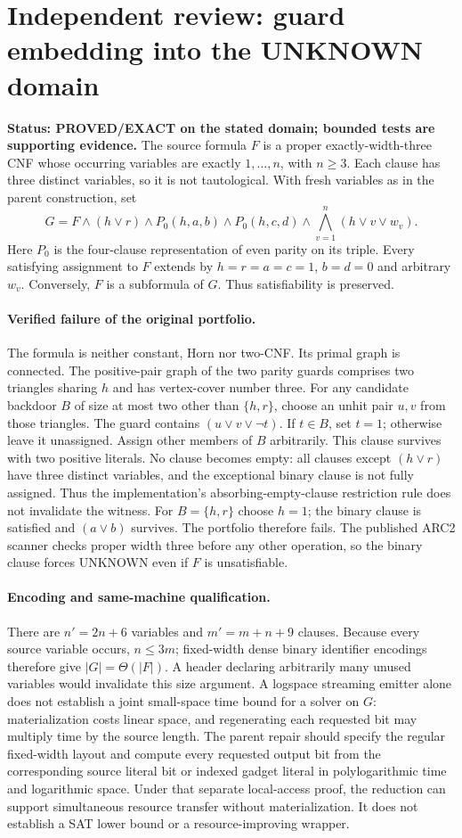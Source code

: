 \documentclass{article}
\begin{document}
\section*{Independent review: guard embedding into the UNKNOWN domain}
\textbf{Status: PROVED/EXACT on the stated domain; bounded tests are supporting evidence.}
The source formula $F$ is a proper exactly-width-three CNF whose occurring
variables are exactly $1,\ldots,n$, with $n\geq3$. Each clause has three distinct
variables, so it is not tautological. With fresh variables as in the parent
construction, set
\[
G=F\wedge(h\vee r)\wedge P_0(h,a,b)\wedge P_0(h,c,d)
\wedge\bigwedge_{v=1}^n(h\vee v\vee w_v).
\]
Here $P_0$ is the four-clause representation of even parity on its triple.
Every satisfying assignment to $F$ extends by $h=r=a=c=1$, $b=d=0$ and arbitrary
$w_v$. Conversely, $F$ is a subformula of $G$. Thus satisfiability is preserved.

\paragraph{Verified failure of the original portfolio.}
The formula is neither constant, Horn nor two-CNF. Its primal graph is connected.
The positive-pair graph of the two parity guards comprises two triangles sharing
$h$ and has vertex-cover number three. For any candidate backdoor $B$ of size
at most two other than $\{h,r\}$, choose an unhit pair $u,v$ from those triangles.
The guard contains $(u\vee v\vee\neg t)$. If $t\in B$, set $t=1$; otherwise
leave it unassigned. Assign other members of $B$ arbitrarily. This clause
survives with two positive literals. No clause becomes empty: all clauses except
$(h\vee r)$ have three distinct variables, and the exceptional binary clause is
not fully assigned. Thus the implementation's absorbing-empty-clause restriction
rule does not invalidate the witness. For $B=\{h,r\}$ choose $h=1$; the binary
clause is satisfied and $(a\vee b)$ survives. The portfolio therefore fails.
The published ARC2 scanner checks proper width three before any other operation,
so the binary clause forces UNKNOWN even if $F$ is unsatisfiable.

\paragraph{Encoding and same-machine qualification.}
There are $n'=2n+6$ variables and $m'=m+n+9$ clauses. Because every source variable
occurs, $n\leq3m$; fixed-width dense binary identifier encodings therefore give
$|G|=\Theta(|F|)$. A header declaring arbitrarily many unused variables would
invalidate this size argument. A logspace streaming emitter alone does not
establish a joint small-space time bound for a solver on $G$: materialization
costs linear space, and regenerating each requested bit may multiply time by
the source length. The parent repair should specify the regular fixed-width
layout and compute every requested output bit from the corresponding source
literal bit or indexed gadget literal in polylogarithmic time and logarithmic
space. Under that separate local-access proof, the reduction can support
simultaneous resource transfer without materialization. It does not establish
a SAT lower bound or a resource-improving wrapper.
\end{document}
